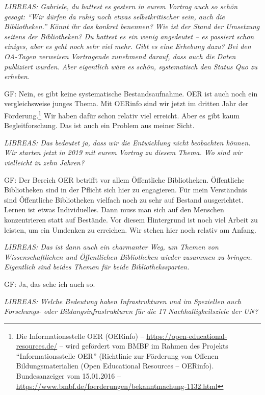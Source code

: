 \documentclass[a4paper,
fontsize=11pt,
oneside,
numbers=noperiodatend,
parskip=half-,
bibliography=totoc,
final
]{scrartcl}
\begin{document}
\emph{LIBREAS: Gabriele, du hattest es gestern in eurem Vortrag auch so
schön gesagt: \enquote{Wir dürfen da ruhig noch etwas selbstkritischer
sein, auch die Bibliotheken.} Könnt ihr das konkret benennen? Wie ist
der Stand der Umsetzung seitens der Bibliotheken? Du hattest es ein
wenig angedeutet -- es passiert schon einiges, aber es geht noch sehr
viel mehr. Gibt es eine Erhebung dazu? Bei den OA-Tagen verweisen
Vortragende zunehmend darauf, dass auch die Daten publiziert wurden.
Aber eigentlich wäre es schön, systematisch den Status Quo zu erheben.}

GF: Nein, es gibt keine systematische Bestandsaufnahme. OER ist auch
noch ein vergleichsweise junges Thema. Mit OERinfo sind wir jetzt im
dritten Jahr der Förderung.\footnote{Die Informationsstelle OER
  (OERinfo) -- \url{https://open-educational-resources.de/} -- wird
  gefördert vom BMBF im Rahmen des Projekts \enquote{Informationsstelle
  OER} (Richtlinie zur Förderung von Offenen Bildungsmaterialien (Open
  Educational Resources -- OERinfo). Bundesanzeiger vom 15.01.2016 --
  \url{https://www.bmbf.de/foerderungen/bekanntmachung-1132.html}} Wir
haben dafür schon relativ viel erreicht. Aber es gibt kaum
Begleitforschung. Das ist auch ein Problem aus meiner Sicht.

\emph{LIBREAS: Das bedeutet ja, dass wir die Entwicklung nicht
beobachten können. Wir starten jetzt in 2019 mit eurem Vortrag zu diesem
Thema. Wo sind wir vielleicht in zehn Jahren?}

GF: Der Bereich OER betrifft vor allem Öffentliche Bibliotheken.
Öffentliche Bibliotheken sind in der Pflicht sich hier zu engagieren.
Für mein Verständnis sind Öffentliche Bibliotheken vielfach noch zu sehr
auf Bestand ausgerichtet. Lernen ist etwas Individuelles. Dann muss man
sich auf den Menschen konzentrieren statt auf Bestände. Vor diesem
Hintergrund ist noch viel Arbeit zu leisten, um ein Umdenken zu
erreichen. Wir stehen hier noch relativ am Anfang.

\emph{LIBREAS: Das ist dann auch ein charmanter Weg, um Themen von
Wissenschaftlichen und Öffentlichen Bibliotheken wieder zusammen zu
bringen. Eigentlich sind beides Themen für beide Bibliothekssparten.}

GF: Ja, das sehe ich auch so.

\emph{LIBREAS: Welche Bedeutung haben Infrastrukturen und im Speziellen
auch Forschungs- oder Bildungsinfrastrukturen für die 17
Nachhaltigkeitsziele der UN?}
\end{document}
